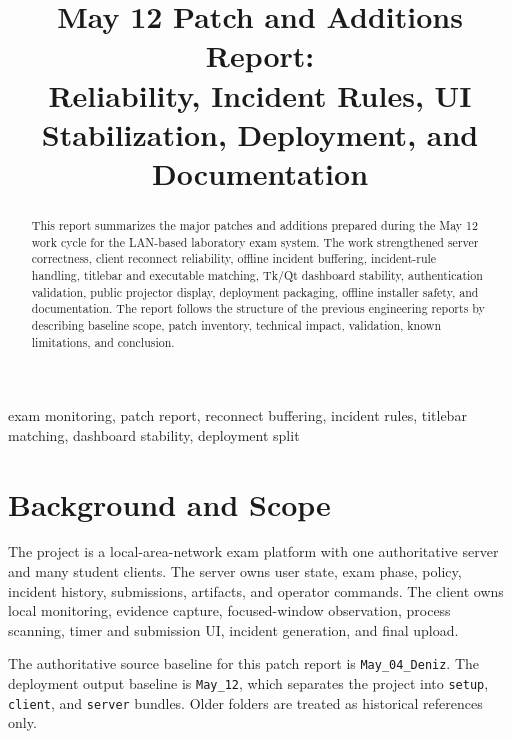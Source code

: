 \documentclass[conference]{IEEEtran}
\begin{document}
\title{May 12 Patch and Additions Report:\\
Reliability, Incident Rules, UI Stabilization, Deployment, and Documentation}

\author{
}

\maketitle

\begin{abstract}
This report summarizes the major patches and additions prepared during the May 12 work cycle for the LAN-based laboratory exam system. The work strengthened server correctness, client reconnect reliability, offline incident buffering, incident-rule handling, titlebar and executable matching, Tk/Qt dashboard stability, authentication validation, public projector display, deployment packaging, offline installer safety, and documentation. The report follows the structure of the previous engineering reports by describing baseline scope, patch inventory, technical impact, validation, known limitations, and conclusion.
\end{abstract}

\begin{IEEEkeywords}
exam monitoring, patch report, reconnect buffering, incident rules, titlebar matching, dashboard stability, deployment split
\end{IEEEkeywords}

\section{Background and Scope}

The project is a local-area-network exam platform with one authoritative server and many student clients. The server owns user state, exam phase, policy, incident history, submissions, artifacts, and operator commands. The client owns local monitoring, evidence capture, focused-window observation, process scanning, timer and submission UI, incident generation, and final upload.

The authoritative source baseline for this patch report is \texttt{May\_04\_Deniz}. The deployment output baseline is \texttt{May\_12}, which separates the project into \texttt{setup}, \texttt{client}, and \texttt{server} bundles. Older folders are treated as historical references only.
\end{document}
